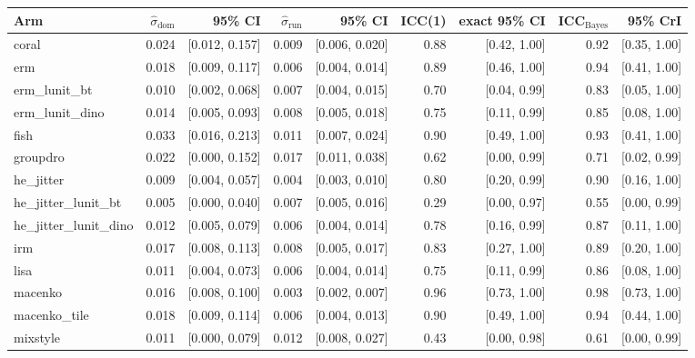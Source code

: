 \begin{tabular}{lrrrrrrrr}
\toprule
Arm & $\hat\sigma_\text{dom}$ & 95\% CI & $\hat\sigma_\text{run}$ & 95\% CI & ICC(1) & exact 95\% CI & ICC$_\text{Bayes}$ & 95\% CrI \\
\midrule
coral & 0.024 & [0.012, 0.157] & 0.009 & [0.006, 0.020] & 0.88 & [0.42, 1.00] & 0.92 & [0.35, 1.00] \\
erm & 0.018 & [0.009, 0.117] & 0.006 & [0.004, 0.014] & 0.89 & [0.46, 1.00] & 0.94 & [0.41, 1.00] \\
erm\_lunit\_bt & 0.010 & [0.002, 0.068] & 0.007 & [0.004, 0.015] & 0.70 & [0.04, 0.99] & 0.83 & [0.05, 1.00] \\
erm\_lunit\_dino & 0.014 & [0.005, 0.093] & 0.008 & [0.005, 0.018] & 0.75 & [0.11, 0.99] & 0.85 & [0.08, 1.00] \\
fish & 0.033 & [0.016, 0.213] & 0.011 & [0.007, 0.024] & 0.90 & [0.49, 1.00] & 0.93 & [0.41, 1.00] \\
groupdro & 0.022 & [0.000, 0.152] & 0.017 & [0.011, 0.038] & 0.62 & [0.00, 0.99] & 0.71 & [0.02, 0.99] \\
he\_jitter & 0.009 & [0.004, 0.057] & 0.004 & [0.003, 0.010] & 0.80 & [0.20, 0.99] & 0.90 & [0.16, 1.00] \\
he\_jitter\_lunit\_bt & 0.005 & [0.000, 0.040] & 0.007 & [0.005, 0.016] & 0.29 & [0.00, 0.97] & 0.55 & [0.00, 0.99] \\
he\_jitter\_lunit\_dino & 0.012 & [0.005, 0.079] & 0.006 & [0.004, 0.014] & 0.78 & [0.16, 0.99] & 0.87 & [0.11, 1.00] \\
irm & 0.017 & [0.008, 0.113] & 0.008 & [0.005, 0.017] & 0.83 & [0.27, 1.00] & 0.89 & [0.20, 1.00] \\
lisa & 0.011 & [0.004, 0.073] & 0.006 & [0.004, 0.014] & 0.75 & [0.11, 0.99] & 0.86 & [0.08, 1.00] \\
macenko & 0.016 & [0.008, 0.100] & 0.003 & [0.002, 0.007] & 0.96 & [0.73, 1.00] & 0.98 & [0.73, 1.00] \\
macenko\_tile & 0.018 & [0.009, 0.114] & 0.006 & [0.004, 0.013] & 0.90 & [0.49, 1.00] & 0.94 & [0.44, 1.00] \\
mixstyle & 0.011 & [0.000, 0.079] & 0.012 & [0.008, 0.027] & 0.43 & [0.00, 0.98] & 0.61 & [0.00, 0.99] \\

\end{tabular}
